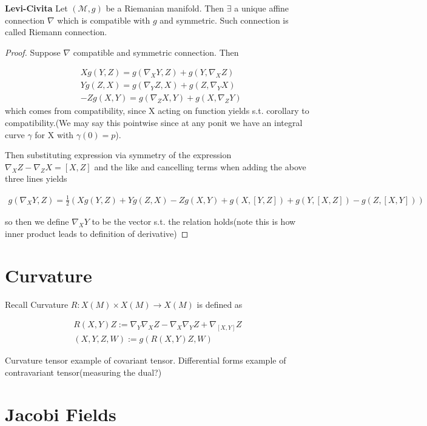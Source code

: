 \documentclass[11pt]{article}
\newcommand{\m}{\mathcal{M}}
\begin{document}
\begin{prop}\textbf{Levi-Civita}
	Let $(\m,g)$ be a Riemanian manifold. Then $\exists$ a unique affine connection $\nabla$ which is compatible with $g$ and symmetric. Such connection is called Riemann connection.
\end{prop}

\begin{proof}
	Suppose $\nabla$ compatible and symmetric connection. Then

	\begin{align*}
		&Xg(Y,Z) = g(\nabla_X Y, Z) + g(Y,\nabla_X Z)\\
		&Yg(Z,X) = g(\nabla_Y Z,X) + g(Z,\nabla_Y X)\\
		&-Zg(X,Y) = g(\nabla_Z X,Y) + g(X,\nabla_Z Y)
	\end{align*}
	which comes from compatibility, since X acting on function yields s.t. corollary to compatibility.(We may say this pointwise since at any ponit we have an integral curve $\gamma$ for X with $\gamma(0) = p$). 

	Then substituting expression via symmetry of the expression $\nabla_X Z - \nabla_Z X = [X,Z]$ and the like and cancelling terms when adding the above three lines yields

	\begin{align*}
		g(\nabla_X Y,Z) = \frac{1}{2}(Xg(Y,Z) + Y g(Z,X) - Zg(X,Y) + g(X,[Y,Z]) + g(Y,[X,Z]) - g(Z,[X,Y]))
	\end{align*}

	so then we define $\nabla_X Y$ to be the vector s.t. the relation holds(note this is how inner product leads to definition of derivative)
\end{proof}

\section{Curvature}

Recall Curvature $R : X(M) \times X(M) \to X(M)$ is defined as

\begin{align*}
	R(X,Y)Z := \nabla_Y\nabla_X Z - \nabla_X\nabla_Y Z + \nabla_{[X,Y]}Z \\
	(X,Y,Z,W) := g(R(X,Y)Z,W)
\end{align*}

Curvature tensor example of covariant tensor. Differential forms example of contravariant tensor(measuring the dual?)

\section{Jacobi Fields}
\end{document}
